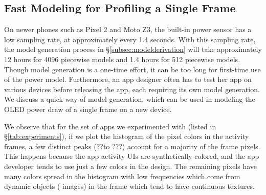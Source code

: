 


\subsection{Fast Modeling for Profiling a Single Frame}
\label{subsec:fast}

On newer phones such as Pixel 2 and Moto Z3, the built-in power sensor has a low
sampling rate, at approximately every 1.4 seconds. With this sampling rate,
the model generation process in \S\ref{subsec:modelderivation} will take approximately 12 hours for 4096
piecewise models and 1.4 hours for 512 piecewise models.
Though model generation is a one-time effort,
it can be too long for first-time use of the power model.
Furthermore, an app designer often has to test her app on various
devices before releasing the app, each requiring its own model generation.
We discuss a quick way of model generation, which can be used
in modeling the OLED power draw of a single frame on a new device.

We observe that for the set of apps we experimented with (listed in
\S\ref{tab:experiments}), if we plot the histogram of the pixel colors
in the activity frames, a few distinct peaks (??to ???) account for a majority of
the frame pixels. This happens because the app activity UIs are
synthetically colored, and the app developer tends to use just a few colors
in the design. The remaining pixels have many colors spread in the
histogram with low frequencies which come from dynamic objects (\eg
images) in the frame which tend to have continuous textures.





